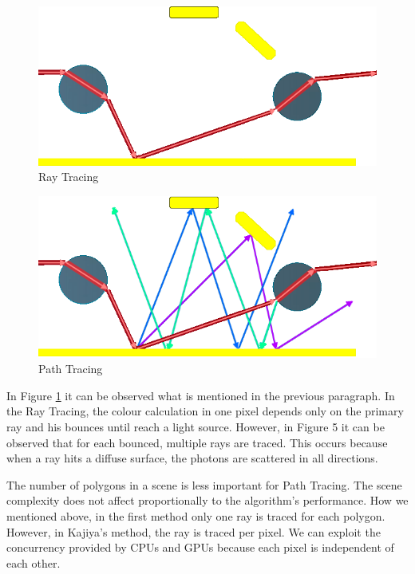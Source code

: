 \documentclass[titlepage,12pt]{report}
\begin{document}
\begin{figure}[!ht]
	\centering
	\includegraphics[scale=0.45]{media/lightPathRT.png}
	\caption{Ray Tracing}
	\label{RT_traced}
\end{figure}

\begin{figure}[!ht]
	\centering
	\includegraphics[scale=0.45]{media/lightPathPT.png}
	\caption{Path Tracing}
	\label{PT_traced}
\end{figure}

In Figure \ref{RT_traced} it can be observed what is mentioned in the previous paragraph. In the Ray Tracing, the colour calculation in one pixel depends only on the primary ray and his bounces until reach a light source. However, in Figure 5 it can be observed that for each bounced, multiple rays are traced. This occurs because when a ray hits a diffuse surface, the photons are scattered in all directions. 

The number of polygons in a scene is less important for Path Tracing. The scene complexity does not affect proportionally to the algorithm's performance. How we mentioned above, in the first method only one ray is traced for each polygon. However, in Kajiya's method, the ray is traced per pixel. We can exploit the concurrency provided by CPUs and GPUs because each pixel is independent of each other.
\end{document}
